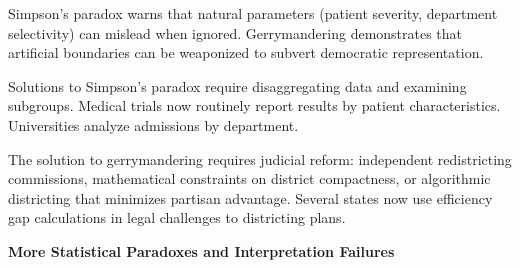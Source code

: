 Simpson's paradox warns that natural parameters (patient severity, department selectivity) can mislead when ignored. Gerrymandering demonstrates that artificial boundaries can be weaponized to subvert democratic representation.

Solutions to Simpson's paradox require disaggregating data and examining subgroups. Medical trials now routinely report results by patient characteristics. Universities analyze admissions by department.

The solution to gerrymandering requires judicial reform: independent redistricting commissions, mathematical constraints on district compactness, or algorithmic districting that minimizes partisan advantage. Several states now use efficiency gap calculations in legal challenges to districting plans.



\newpage

\begin{center}
{\Large \textbf{More Statistical Paradoxes and Interpretation Failures}}

\end{center}

\vspace{1em}

